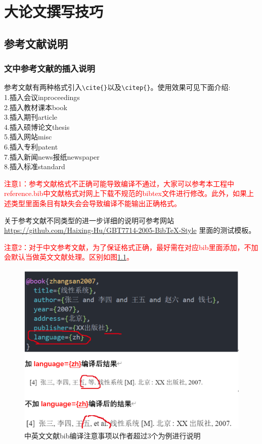 \chapter{大论文撰写技巧}

\section{参考文献说明}
\subsection{文中参考文献的插入说明}
参考文献有两种格式引入\verb+\cite{}+以及\verb+\citep{}+。使用效果可见下面介绍:\\
1.插入会议inproceedings\cite{zhao2015bearing0}\\
2.插入教材课本book\cite{williams1991probability,chengzhaolin2006,zhangsan2007}\\
3.插入期刊article\cite{cao2011formation,xue2015formation}\\
4.插入硕博论文thesis\cite{lisi2015,wangwu2015,deans2005bearings}\\
5.插入网站misc\cite{irdawebsite,h7n9,wikipedia_moores_law}\\
6.插入专利patent\cite{xiao2012yi,p6915001}\\
7.插入新闻news报纸newspaper\cite{zhang2000,renminribao}\\
8.插入标准standard\cite{gbt3469-1983}

\textcolor{red}{注意1：参考文献格式不正确可能导致编译不通过，大家可以参考本工程中reference.bib中文献格式对网上下载不规范的bibtex文件进行修改。此外，如果上述类型里面条目有缺失会会导致编译不能输出正确格式。}

关于参考文献不同类型的进一步详细的说明可参考网站\url{https://github.com/Haixing-Hu/GBT7714-2005-BibTeX-Style}
里面的测试模板。


\textcolor{red}{注意2：对于中文参考文献，为了保证格式正确，最好需在对应bib里面添加，不加会默认当做英文文献处理。区别如图\ref{fig_bib0}。}

\begin{figure}[!htb]
  \centering
  \includegraphics[width=1\textwidth]{manual/figures/中英文文献bib编译注意事项}
  \caption{中英文文献bib编译注意事项以作者超过3个为例进行说明}
  \label{fig_bib0}
\end{figure}

